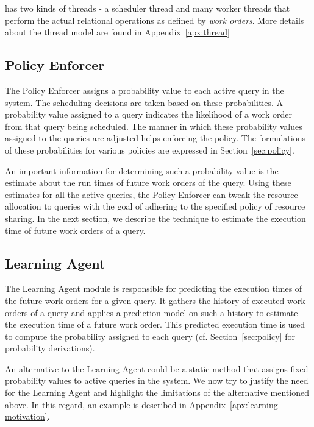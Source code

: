 \sys{} has two kinds of threads - a scheduler thread and many worker threads that perform the actual relational operations as defined by \textit{work orders}. 
More details about the thread model are found in Appendix~\ref{apx:thread}

\subsection{Policy Enforcer}\label{ssec:policy-enforcer}
The Policy Enforcer assigns a probability value to each active query in the system. 
The scheduling decisions are taken based on these probabilities. 
A probability value assigned to a query indicates the likelihood of a work order from that query being scheduled. 
The manner in which these probability values assigned to the queries are adjusted helps enforcing the policy. 
The formulations of these probabilities for various policies are expressed in Section~\ref{sec:policy}.

An important information for determining such a probability value is the estimate about the run times of future work orders of the query.
Using these estimates for all the active queries, the Policy Enforcer can tweak the resource allocation to queries with the goal of adhering to the specified policy of resource sharing. 
In the next section, we describe the technique to estimate the execution time of future work orders of a query.
\subsection{Learning Agent}\label{ssec:learning}
The Learning Agent module is responsible for predicting the execution times of the future work orders for a given query. 
It gathers the history of executed work orders of a query and applies a prediction model on such a history to estimate the execution time of a future work order.
This predicted execution time is used to compute the probability assigned to each query (cf. Section~\ref{sec:policy} for probability derivations).

An alternative to the Learning Agent could be a static method that assigns fixed probability values to active queries in the system. 
We now try to justify the need for the Learning Agent and highlight the limitations of the alternative mentioned above.
In this regard, an example is described in Appendix~\ref{apx:learning-motivation}.

